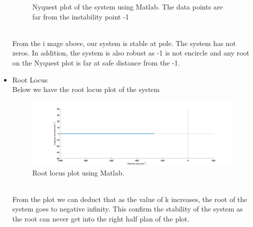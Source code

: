 \documentclass[12pt,letterpaper]{article}
\begin{document}
\begin{itemize}
\begin{figure}[h]
        \caption{Nyquest plot of the system using Matlab. The data points are far from the instability point -1 }
    \end{figure}\\
    From the i mage above, our system is stable at pole. The system has not zeros. 
    In addition, the system is also robust as -1 is not encircle and any root on the 
    Nyquest plot is far at safe distance from the -1. 
    \item Root Locus\\
    Below we have the root locus plot of the system
    \begin{figure}[h]
        \centering
        \includegraphics[width=15cm]{rlocus.jpg}
        \caption{Root locus plot using Matlab.}
    \end{figure}\\
    From the plot we can deduct that as the value of k increases, the root of the system 
    goes to negative infinity. This confirm the stability of the system as the root 
    can never get into the right half plan of the plot.
\end{itemize}
\end{document}
